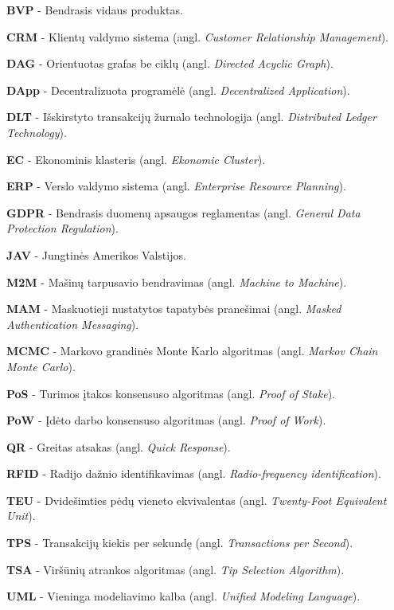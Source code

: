 

\noindent \textbf{BVP} - Bendrasis vidaus produktas.

\noindent \textbf{CRM} - Klientų valdymo sistema (angl. \textit{Customer Relationship Management}).

\noindent \textbf{DAG} - Orientuotas grafas be ciklų (angl. \textit{Directed Acyclic Graph}).

\noindent \textbf{DApp} - Decentralizuota programėlė (angl. \textit{Decentralized Application}).

\noindent \textbf{DLT} - Išskirstyto transakcijų žurnalo technologija (angl. \textit{Distributed Ledger Technology}).

\noindent \textbf{EC} - Ekonominis klasteris (angl. \textit{Ekonomic Cluster}).

\noindent \textbf{ERP} - Verslo valdymo sistema (angl. \textit{Enterprise Resource Planning}).

\noindent \textbf{GDPR} - Bendrasis duomenų apsaugos reglamentas (angl. \textit{General Data Protection Regulation}).

\noindent \textbf{JAV} - Jungtinės Amerikos Valstijos.

\noindent \textbf{M2M} - Mašinų tarpusavio bendravimas (angl. \textit{Machine to Machine}).

\noindent \textbf{MAM} - Maskuotieji nustatytos tapatybės pranešimai (angl. \textit{Masked Authentication Messaging}).

\noindent \textbf{MCMC} - Markovo grandinės Monte Karlo algoritmas (angl. \textit{Markov Chain Monte Carlo}).

\noindent \textbf{PoS} - Turimos įtakos konsensuso algoritmas (angl. \textit{Proof of Stake}).

\noindent \textbf{PoW} - Įdėto darbo konsensuso algoritmas (angl. \textit{Proof of Work}).

\noindent \textbf{QR} - Greitas atsakas (angl. \textit{Quick Response}).

\noindent \textbf{RFID} - Radijo dažnio identifikavimas (angl. \textit{Radio-frequency identification}).

\noindent \textbf{TEU} - Dvidešimties pėdų vieneto ekvivalentas (angl. \textit{Twenty-Foot Equivalent Unit}).

\noindent \textbf{TPS} - Transakcijų kiekis per sekundę (angl. \textit{Transactions per Second}).

\noindent \textbf{TSA} - Viršūnių atrankos algoritmas (angl. \textit{Tip Selection Algorithm}).

\noindent \textbf{UML} - Vieninga modeliavimo kalba (angl. \textit{Unified Modeling Language}).